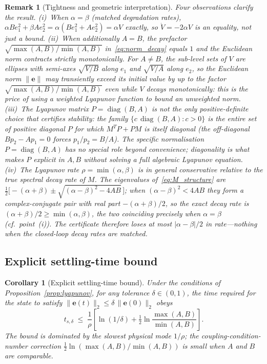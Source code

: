 \documentclass[12pt]{article}
\newtheorem{corollary}{Corollary}
\newtheorem{remark}{Remark}
\begin{document}
\begin{remark}[Tightness and geometric interpretation]
\label{rem:lyap_tight}
Four observations clarify the result.
(i)~When $\alpha=\beta$ (matched degradation rates),
$\alpha B e_1^2 + \beta A e_2^2 = \alpha(B e_1^2 + A e_2^2) = \alpha V$
\emph{exactly}, so $\dot V = -2\alpha V$ is an equality, not just a bound.
(ii)~When additionally $A=B$, the prefactor $\sqrt{\max(A,B)/\min(A,B)}$
in~\eqref{eq:norm_decay} equals $1$ and the Euclidean norm contracts
strictly monotonically. For $A\neq B$, the sub-level sets of $V$ are
ellipses with semi-axes $\sqrt{V/B}$ along $e_1$ and $\sqrt{V/A}$ along
$e_2$, so the Euclidean norm $\|\mathbf{e}\|$ may transiently exceed its
initial value by up to the factor $\sqrt{\max(A,B)/\min(A,B)}$ even while
$V$ decays monotonically: this is the price of using a weighted Lyapunov
function to bound an unweighted norm.
(iii)~The Lyapunov matrix $P = \operatorname{diag}(B, A)$ is not the only
positive-definite choice that certifies stability: the family
$\{c\,\operatorname{diag}(B,A): c>0\}$ is the entire set of positive diagonal
$P$ for which $M^T P + PM$ is itself diagonal (the off-diagonal
$B p_2 - A p_1 = 0$ forces $p_1/p_2 = B/A$). The specific normalisation
$P=\operatorname{diag}(B,A)$ has no special role beyond convenience;
diagonality is what makes $P$ explicit in $A,B$ without solving a full
algebraic Lyapunov equation.
(iv)~The Lyapunov rate $\rho=\min(\alpha,\beta)$ is in general
conservative relative to the true spectral decay rate of $M$. The
eigenvalues of~\eqref{eq:M_structure} are
$\tfrac12\bigl[-(\alpha+\beta)\pm\sqrt{(\alpha-\beta)^2-4AB}\,\bigr]$;
when $(\alpha-\beta)^2<4AB$ they form a complex-conjugate pair with real
part $-(\alpha+\beta)/2$, so the exact decay rate is
$(\alpha+\beta)/2\ge\min(\alpha,\beta)$, the two coinciding precisely
when $\alpha=\beta$ (cf.\ point~(i)). The certificate therefore loses at
most $|\alpha-\beta|/2$ in rate---nothing when the closed-loop decay
rates are matched.
\end{remark}

\subsection{Explicit settling-time bound}
\label{sec:lyap_settling}

\begin{corollary}[Explicit settling-time bound]
\label{cor:settling}
Under the conditions of Proposition~\ref{prop:lyapunov}, for any tolerance
$\delta\in (0,1)$, the time required for the state to satisfy
$\|\mathbf{e}(t)\|_2 \leq \delta\,\|\mathbf{e}(0)\|_2$ obeys
\begin{equation}
t_{s,\delta} \;\leq\; \frac{1}{\rho}\left[\ln(1/\delta) + \tfrac{1}{2}\ln\!\frac{\max(A,B)}{\min(A,B)}\right].
\label{eq:settling_bound}
\end{equation}
The bound is dominated by the slowest physical mode $1/\rho$; the
coupling-condition-number correction
$\tfrac{1}{2}\ln(\max(A,B)/\min(A,B))$ is small when $A$ and $B$ are
comparable.
\end{corollary}
\end{document}

